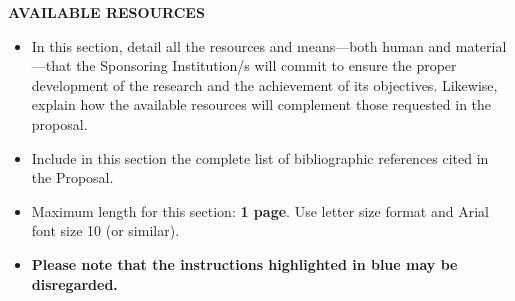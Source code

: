 \documentclass[demo, MAIN.tex]{subfiles}
\begin{document}
\noindent\textbf{AVAILABLE RESOURCES}

\medskip

\begin{tcolorbox}[instructions]
  \color{fondecytblue}
  \begin{itemize}[dashitem]
  \item In this section, detail all the resources and means---both human and material---that the Sponsoring Institution/s will commit to ensure the proper development of the research and the achievement of its objectives. Likewise, explain how the available resources will complement those requested in the proposal.
  \item Include in this section the complete list of bibliographic references cited in the Proposal.
  \item Maximum length for this section: \textbf{1 page}. Use letter size format and Arial font size 10 (or similar).
  \item \textbf{Please note that the instructions highlighted in blue may be disregarded.}
  \end{itemize}
\end{tcolorbox}

\bigskip
\end{document}
